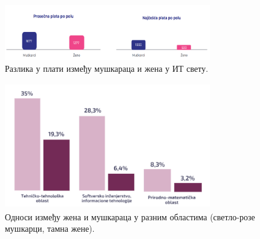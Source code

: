 \documentclass[a4paper]{article}
\begin{document}
\begin{figure}[h!]
    \begin{center}
        \includegraphics[width=0.8\textwidth]{Slike/plate.png}
    \end{center}
    \caption{Разлика у плати између мушкараца и жена у ИТ свету.}
    \label{fig:plate_it}
\end{figure}

\begin{figure}[h!]
    \begin{center}
        \includegraphics[width=0.8\textwidth, height=5.5cm]{Slike/odnosi.png}
    \end{center}
    \caption{Односи између жена и мушкараца у разним областима (светло-розе мушкарци, тамна жене).}
    \label{fig:odnosi}
\end{figure}

\newpage
\end{document}

